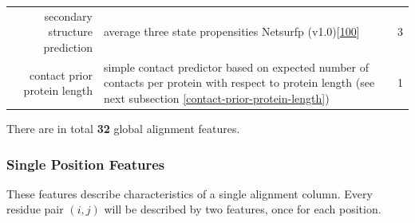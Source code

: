 \documentclass[12pt,a4paper,twoside]{book}
\theoremstyle{definition}
\theoremstyle{definition}
\theoremstyle{remark}
\begin{document}
\begin{longtable}[]{@{}rlc@{}}
\begin{minipage}[t]{0.23\columnwidth}
secondary structure prediction\strut
\end{minipage} & \begin{minipage}[t]{0.50\columnwidth}\raggedright\strut
average three state propensities Netsurfp
(v1.0){[}\protect\hyperlink{ref-Petersen2009a}{100}{]}\strut
\end{minipage} & \begin{minipage}[t]{0.18\columnwidth}\centering\strut
3\strut
\end{minipage}\tabularnewline
\begin{minipage}[t]{0.23\columnwidth}\raggedleft\strut
contact prior protein length\strut
\end{minipage} & \begin{minipage}[t]{0.50\columnwidth}\raggedright\strut
simple contact predictor based on expected number of contacts per
protein with respect to protein length (see next subsection
\ref{contact-prior-protein-length})\strut
\end{minipage} & \begin{minipage}[t]{0.18\columnwidth}\centering\strut
1\strut
\end{minipage}\tabularnewline
\bottomrule
\end{longtable}

There are in total \textbf{32} global alignment features.

\subsubsection{Single Position Features}\label{seq-features-single}

These features describe characteristics of a single alignment column.
Every residue pair \((i,j)\) will be described by two features, once for
each position.
\end{document}
